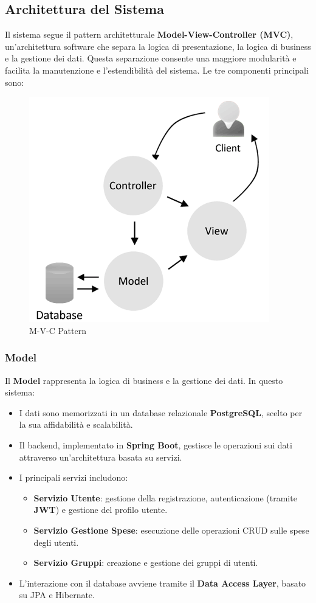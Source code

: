 
\subsection{Architettura del Sistema}

Il sistema segue il pattern architetturale \textbf{Model-View-Controller (MVC)}, un'architettura software che separa la logica di presentazione, la logica di business e la gestione dei dati. Questa separazione consente una maggiore modularità e facilita la manutenzione e l'estendibilità del sistema. Le tre componenti principali sono:
\begin{figure}[H]
    \centering
    \includegraphics[scale=0.45]{images/mvc.png}
    \caption{M-V-C Pattern }
\end{figure}
\subsubsection{Model}
Il \textbf{Model} rappresenta la logica di business e la gestione dei dati. In questo sistema:
\begin{itemize}
    \item I dati sono memorizzati in un database relazionale \textbf{PostgreSQL}, scelto per la sua affidabilità e scalabilità.
    \item Il backend, implementato in \textbf{Spring Boot}, gestisce le operazioni sui dati attraverso un'architettura basata su servizi.
    \item I principali servizi includono:
    \begin{itemize}
        \item \textbf{Servizio Utente}: gestione della registrazione, autenticazione (tramite \textbf{JWT}) e gestione del profilo utente.
        \item \textbf{Servizio Gestione Spese}: esecuzione delle operazioni CRUD sulle spese degli utenti.
        \item \textbf{Servizio Gruppi}: creazione e gestione dei gruppi di utenti.
    \end{itemize}
    \item L'interazione con il database avviene tramite il \textbf{Data Access Layer}, basato su JPA e Hibernate.
\end{itemize}

